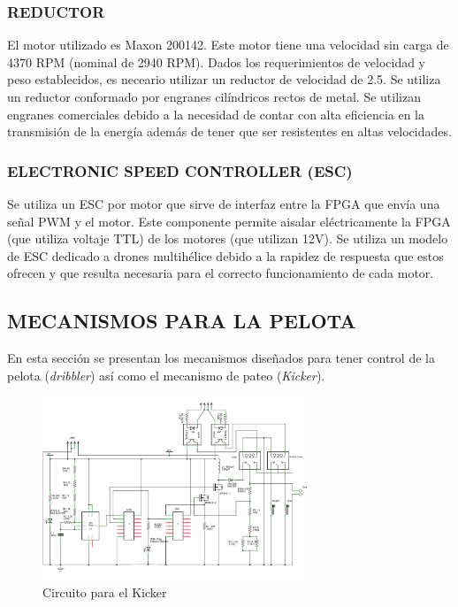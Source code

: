 \documentclass[twocolumn,10pt]{amrob}
\begin{document}
\subsubsection*{REDUCTOR}
El motor utilizado es Maxon 200142. Este motor tiene una velocidad sin carga de 4370 RPM (nominal de 2940 RPM). Dados los requerimientos de velocidad y peso establecidos, es neceario utilizar un reductor de velocidad de 2.5. Se utiliza un reductor conformado por engranes cilíndricos rectos de metal. Se utilizan engranes comerciales debido a la necesidad de contar con alta eficiencia en la transmisión de la energía además de tener que ser resistentes en altas velocidades. \par
\subsubsection*{ELECTRONIC SPEED CONTROLLER (ESC)}
Se utiliza un ESC por motor que sirve de interfaz entre la FPGA que envía una señal PWM y el motor. Este componente permite aisalar eléctricamente la FPGA (que utiliza voltaje TTL) de los motores (que utilizan 12V). Se utiliza un modelo de ESC dedicado a drones multihélice debido a la rapidez de respuesta que estos ofrecen y que resulta necesaria para el correcto funcionamiento de cada motor.\par 
\subsection*{MECANISMOS PARA LA PELOTA}
En esta sección se presentan los mecanismos diseñados para tener control de la pelota (\textit{dribbler}) así como el mecanismo de pateo (\textit{Kicker}).
\begin{figure}
  \centering
    \includegraphics[width=8cm]{circuitoKicker.png}
  \caption{Circuito para el Kicker}
  \label{fig:elecKicker}
\end{figure}
\end{document}
